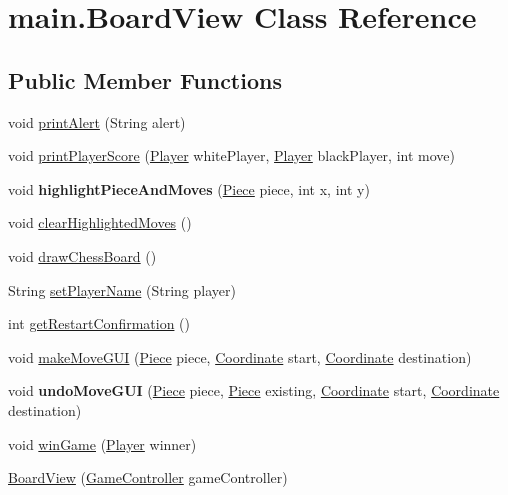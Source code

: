 \hypertarget{classmain_1_1_board_view}{}\section{main.\+Board\+View Class Reference}
\label{classmain_1_1_board_view}
\subsection*{Public Member Functions}
\begin{DoxyCompactItemize}
\item 
void \hyperlink{classmain_1_1_board_view_abf8539621e57668f50384263421bcd64}{print\+Alert} (String alert)
\item 
void \hyperlink{classmain_1_1_board_view_afc93a6cc3fef67fcee90f8e810b52661}{print\+Player\+Score} (\hyperlink{classmain_1_1_player}{Player} white\+Player, \hyperlink{classmain_1_1_player}{Player} black\+Player, int move)
\item 
\hypertarget{classmain_1_1_board_view_a3f764ba1506eff88c6a7af6d8e1cd730}{}\label{classmain_1_1_board_view_a3f764ba1506eff88c6a7af6d8e1cd730} 
void {\bfseries highlight\+Piece\+And\+Moves} (\hyperlink{classmain_1_1pieces_1_1_piece}{Piece} piece, int x, int y)
\item 
void \hyperlink{classmain_1_1_board_view_ade8846909c28b72183b98969738d2241}{clear\+Highlighted\+Moves} ()
\item 
void \hyperlink{classmain_1_1_board_view_ac99be3e6d9ed0a37b4021a1d784e9441}{draw\+Chess\+Board} ()
\item 
String \hyperlink{classmain_1_1_board_view_a8d424c35461ea83d9f5e4cae9b00b90a}{set\+Player\+Name} (String player)
\item 
int \hyperlink{classmain_1_1_board_view_a82d7f743c08c4f25eb327af4d42d3786}{get\+Restart\+Confirmation} ()
\item 
void \hyperlink{classmain_1_1_board_view_a2ad894c74ae1e240dabe0739ba2c3367}{make\+Move\+G\+UI} (\hyperlink{classmain_1_1pieces_1_1_piece}{Piece} piece, \hyperlink{classmain_1_1model_1_1_coordinate}{Coordinate} start, \hyperlink{classmain_1_1model_1_1_coordinate}{Coordinate} destination)
\item 
\hypertarget{classmain_1_1_board_view_a6be97af8124c34611b68642eb2ab61c3}{}\label{classmain_1_1_board_view_a6be97af8124c34611b68642eb2ab61c3} 
void {\bfseries undo\+Move\+G\+UI} (\hyperlink{classmain_1_1pieces_1_1_piece}{Piece} piece, \hyperlink{classmain_1_1pieces_1_1_piece}{Piece} existing, \hyperlink{classmain_1_1model_1_1_coordinate}{Coordinate} start, \hyperlink{classmain_1_1model_1_1_coordinate}{Coordinate} destination)
\item 
void \hyperlink{classmain_1_1_board_view_a44d95afe82790b029cc40627ab5a88cb}{win\+Game} (\hyperlink{classmain_1_1_player}{Player} winner)
\item 
\hyperlink{classmain_1_1_board_view_afe3a4667992e92840f301182e8a5531e}{Board\+View} (\hyperlink{classmain_1_1_game_controller}{Game\+Controller} game\+Controller)
\end{DoxyCompactItemize}


